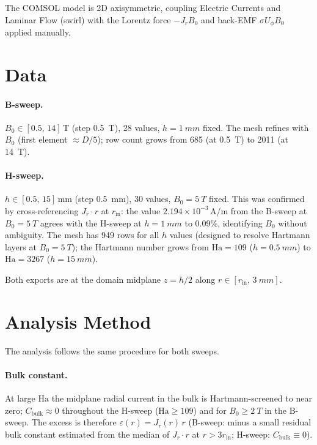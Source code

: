 \documentclass[11pt, a4paper]{article}
\begin{document}
The COMSOL model is 2D axisymmetric, coupling Electric Currents and Laminar Flow
(swirl) with the Lorentz force $-J_r B_0$ and back-EMF
$\sigma U_\phi B_0$ applied manually.

\section{Data}

\paragraph{B-sweep.}
$B_0 \in [0.5,\,14]$\,T (step \SI{0.5}{T}), 28 values, $h = \SI{1}{mm}$ fixed.
The mesh refines with $B_0$ (first element $\approx D/5$); row count grows from
685 (at \SI{0.5}{T}) to 2011 (at \SI{14}{T}).

\paragraph{H-sweep.}
$h \in [0.5,\,15]$\,mm (step \SI{0.5}{mm}), 30 values, $B_0 = \SI{5}{T}$ fixed.
This was confirmed by cross-referencing $J_r \cdot r$ at $r_\mathrm{in}$: the value
$2.194 \times 10^{-3}$\,A/m from the B-sweep at $B_0 = \SI{5}{T}$ agrees with the
H-sweep at $h = \SI{1}{mm}$ to 0.09\%, identifying $B_0$ without ambiguity.
The mesh has 949 rows for all $h$ values (designed to resolve Hartmann layers at
$B_0 = \SI{5}{T}$); the Hartmann number grows from $\mathrm{Ha}=109$ ($h=\SI{0.5}{mm}$)
to $\mathrm{Ha}=3267$ ($h=\SI{15}{mm}$).

Both exports are at the domain midplane $z=h/2$ along $r\in[r_\mathrm{in},\,\SI{3}{mm}]$.

\section{Analysis Method}

The analysis follows the same procedure for both sweeps.

\paragraph{Bulk constant.}
At large $\mathrm{Ha}$ the midplane radial current in the bulk is
Hartmann-screened to near zero; $C_\mathrm{bulk} \approx 0$ throughout the H-sweep
($\mathrm{Ha} \geq 109$) and for $B_0 \geq \SI{2}{T}$ in the B-sweep.
The excess is therefore $\varepsilon(r) = J_r(r)\,r$ (B-sweep: minus a small residual
bulk constant estimated from the median of $J_r\cdot r$ at $r > 3r_\mathrm{in}$;
H-sweep: $C_\mathrm{bulk}\equiv 0$).
\end{document}
